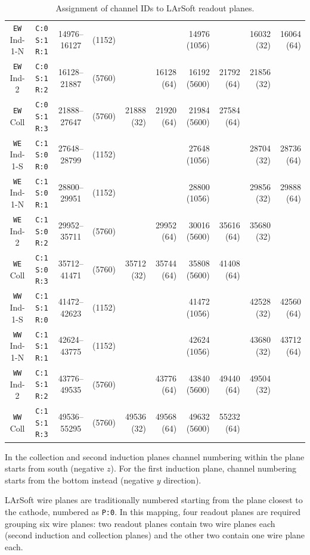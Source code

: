 \begin{table}
\begin{tabular}{|cc|cc|rrrrrr|}
    \texttt{EW} Ind-1-N & \texttt{C:0 S:1 R:1} & 14976--16127 & (1152) &            &            & 14976 (1056) &            & 16032 (32) & 16064 (64) \\
    \texttt{EW} Ind-2   & \texttt{C:0 S:1 R:2} & 16128--21887 & (5760) &            & 16128 (64) & 16192 (5600) & 21792 (64) & 21856 (32) &            \\
    \texttt{EW} Coll    & \texttt{C:0 S:1 R:3} & 21888--27647 & (5760) & 21888 (32) & 21920 (64) & 21984 (5600) & 27584 (64) &            &            \\
    \hline
    \hline
    \texttt{WE} Ind-1-S & \texttt{C:1 S:0 R:0} & 27648--28799 & (1152) &            &            & 27648 (1056) &            & 28704 (32) & 28736 (64) \\
    \texttt{WE} Ind-1-N & \texttt{C:1 S:0 R:1} & 28800--29951 & (1152) &            &            & 28800 (1056) &            & 29856 (32) & 29888 (64) \\
    \texttt{WE} Ind-2   & \texttt{C:1 S:0 R:2} & 29952--35711 & (5760) &            & 29952 (64) & 30016 (5600) & 35616 (64) & 35680 (32) &            \\
    \texttt{WE} Coll    & \texttt{C:1 S:0 R:3} & 35712--41471 & (5760) & 35712 (32) & 35744 (64) & 35808 (5600) & 41408 (64) &            &            \\
    \hline
    \texttt{WW} Ind-1-S & \texttt{C:1 S:1 R:0} & 41472--42623 & (1152) &            &            & 41472 (1056) &            & 42528 (32) & 42560 (64) \\
    \texttt{WW} Ind-1-N & \texttt{C:1 S:1 R:1} & 42624--43775 & (1152) &            &            & 42624 (1056) &            & 43680 (32) & 43712 (64) \\
    \texttt{WW} Ind-2   & \texttt{C:1 S:1 R:2} & 43776--49535 & (5760) &            & 43776 (64) & 43840 (5600) & 49440 (64) & 49504 (32) &            \\
    \texttt{WW} Coll    & \texttt{C:1 S:1 R:3} & 49536--55295 & (5760) & 49536 (32) & 49568 (64) & 49632 (5600) & 55232 (64) &            &            \\
    \hline
    \hline
  \end{tabular}
  \caption{
    Assignment of channel IDs to LArSoft readout planes.
    \label{table:LArSoftChannels}
  }
\end{table}

In the collection and second induction planes channel numbering within the plane
starts from south (negative $z$).
For the first induction plane, channel numbering starts from the bottom instead
(negative $y$ direction).

LArSoft wire planes are traditionally numbered starting from the plane closest
to the cathode, numbered as \texttt{P:0}.
In this mapping, four readout planes are required grouping six wire planes:
two readout planes contain two wire planes each (second induction and collection planes)
and the other two contain one wire plane each.


